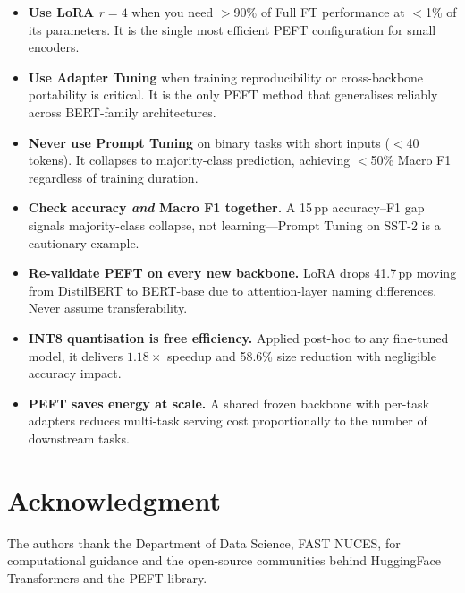 \documentclass[conference]{IEEEtran}
\begin{document}
\begin{tcolorbox}[
  enhanced, breakable,
  colback=lightyellow,
  colframe=darkblue,
  arc=4pt,
  boxrule=1pt,
  title={\bfseries\color{white} Key Takeaways for Practitioners},
  fonttitle=\bfseries,
  coltitle=white,
  attach boxed title to top left={yshift=-2mm, xshift=4mm},
  boxed title style={colback=darkblue, arc=2pt}
]
\begin{itemize}\setlength\itemsep{2pt}
  \item \textbf{Use LoRA $r{=}4$} when you need $>$90\% of Full FT performance at $<$1\% of its parameters. It is the single most efficient PEFT configuration for small encoders.
  \item \textbf{Use Adapter Tuning} when training reproducibility or cross-backbone portability is critical. It is the only PEFT method that generalises reliably across BERT-family architectures.
  \item \textbf{Never use Prompt Tuning} on binary tasks with short inputs ($<$40 tokens). It collapses to majority-class prediction, achieving $<$50\% Macro F1 regardless of training duration.
  \item \textbf{Check accuracy \emph{and} Macro F1 together.} A 15\,pp accuracy--F1 gap signals majority-class collapse, not learning---Prompt Tuning on SST-2 is a cautionary example.
  \item \textbf{Re-validate PEFT on every new backbone.} LoRA drops 41.7\,pp moving from DistilBERT to BERT-base due to attention-layer naming differences. Never assume transferability.
  \item \textbf{INT8 quantisation is free efficiency.} Applied post-hoc to any fine-tuned model, it delivers $1.18\times$ speedup and 58.6\% size reduction with negligible accuracy impact.
  \item \textbf{PEFT saves energy at scale.} A shared frozen backbone with per-task adapters reduces multi-task serving cost proportionally to the number of downstream tasks.
\end{itemize}
\end{tcolorbox}

\section*{Acknowledgment}
The authors thank the Department of Data Science, FAST NUCES, for computational guidance and the open-source communities behind HuggingFace Transformers and the PEFT library.
\end{document}
